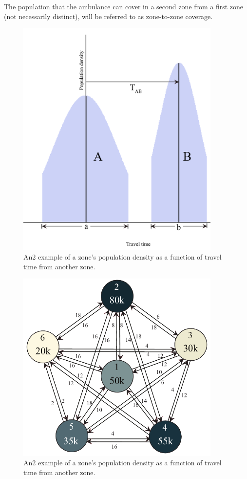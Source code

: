 \documentclass[notitlepage, 12pt]{article}
\begin{document}
The population that the ambulance can cover in a second zone from a first zone (not necessarily distinct), will be referred to as zone-to-zone coverage.
\newpage

\begin{figure}[htbp]
\begin{center}
\includegraphics[width=4in]{A(t)B(t).png}
\caption{An2 example of a zone's population density as a function of travel time from another zone.}
\label{A(t)B(t)}
\end{center}
\end{figure}

\begin{figure}[htbp]
\begin{center}
\includegraphics[width=4in]{6point.pdf}
\caption{An2 example of a zone's population density as a function of travel time from another zone.}
\label{A(t)B(t)}
\end{center}
\end{figure}
\end{document}
